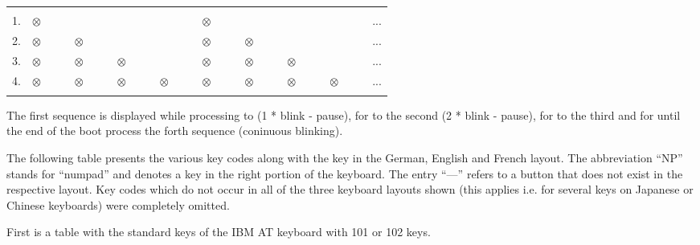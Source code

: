   {\def\led{\begin{math}\otimes\quad\quad\end{math}}
  \begin{tabular}{c l l l l l l l l l}
    \quad\\
    1. & \led & & & & \led & & & & ... \\ 
    2. & \led & \led & & & \led & \led & & & ... \\ 
    3. & \led & \led & \led & & \led & \led & \led & & ... \\ 
    4. & \led & \led & \led & \led & \led & \led & \led & \led & ... \\ 
    \quad 
  \end{tabular}}

  The first sequence is displayed while processing  to 
  \newline(1 * blink - pause),\newline
  for  to  the second (2 * blink - pause),\newline
  for  to  the third and \newline
  for  until the end of the boot process the forth sequence (coninuous blinking).
    

The following table presents the various key codes along with the key in the German, English 
and French layout. The abbreviation ``NP'' stands for ``numpad'' and denotes a key in the right 
portion of the keyboard. The entry ``---'' refers to a button that does not exist in the respective layout. Key codes which do not occur in all of the three keyboard layouts shown (this applies
i.e. for several keys on Japanese or Chinese keyboards) were completely omitted.

First is a table with the standard keys of the IBM AT keyboard with 101
or 102 keys.

\newcommand\twoheaduparrow{\mathrel{\rotatebox[origin=c]{90}{$\twoheadrightarrow$}}}
\newcommand\twoheaddownarrow{\mathrel{\rotatebox[origin=c]{270}{$\twoheadrightarrow$}}}

